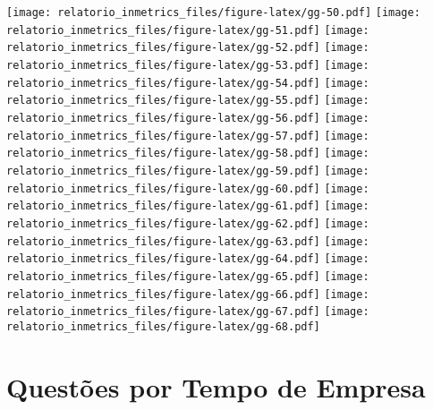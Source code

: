 \documentclass[]{book}
\begin{document}
\texttt{[image: relatorio\_inmetrics\_files/figure-latex/gg-50.pdf]} \texttt{[image: relatorio\_inmetrics\_files/figure-latex/gg-51.pdf]} \texttt{[image: relatorio\_inmetrics\_files/figure-latex/gg-52.pdf]} \texttt{[image: relatorio\_inmetrics\_files/figure-latex/gg-53.pdf]} \texttt{[image: relatorio\_inmetrics\_files/figure-latex/gg-54.pdf]} \texttt{[image: relatorio\_inmetrics\_files/figure-latex/gg-55.pdf]} \texttt{[image: relatorio\_inmetrics\_files/figure-latex/gg-56.pdf]} \texttt{[image: relatorio\_inmetrics\_files/figure-latex/gg-57.pdf]} \texttt{[image: relatorio\_inmetrics\_files/figure-latex/gg-58.pdf]} \texttt{[image: relatorio\_inmetrics\_files/figure-latex/gg-59.pdf]} \texttt{[image: relatorio\_inmetrics\_files/figure-latex/gg-60.pdf]} \texttt{[image: relatorio\_inmetrics\_files/figure-latex/gg-61.pdf]} \texttt{[image: relatorio\_inmetrics\_files/figure-latex/gg-62.pdf]} \texttt{[image: relatorio\_inmetrics\_files/figure-latex/gg-63.pdf]} \texttt{[image: relatorio\_inmetrics\_files/figure-latex/gg-64.pdf]} \texttt{[image: relatorio\_inmetrics\_files/figure-latex/gg-65.pdf]} \texttt{[image: relatorio\_inmetrics\_files/figure-latex/gg-66.pdf]} \texttt{[image: relatorio\_inmetrics\_files/figure-latex/gg-67.pdf]} \texttt{[image: relatorio\_inmetrics\_files/figure-latex/gg-68.pdf]}

\hypertarget{questoes-por-tempo-de-empresa}{%
\section{Questões por Tempo de Empresa}\label{questoes-por-tempo-de-empresa}}
\end{document}
